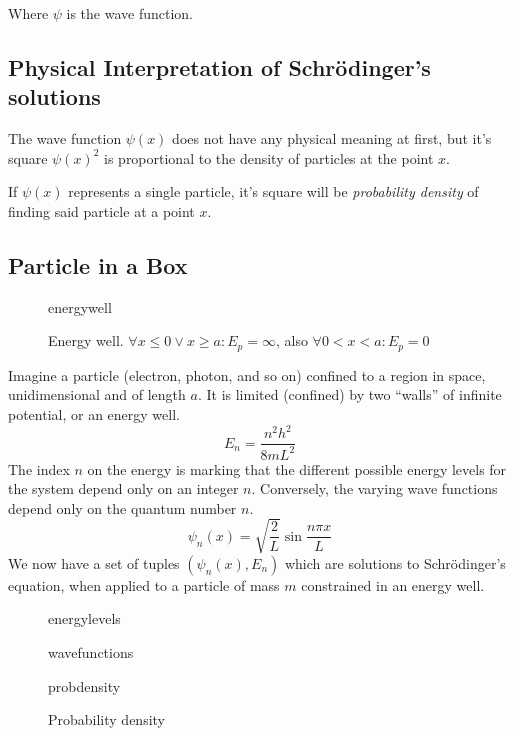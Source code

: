 \documentclass[10pt]{article}
\begin{document}
Where $\psi$ is the wave function.

\subsection{Physical Interpretation of Schrödinger's solutions}
The wave function $\psi(x)$ does not have any physical meaning at first, but
it's square $\psi{(x)}^2$ is proportional to the density of particles at the point
$x$.

If $\psi(x)$ represents a single particle, it's square will be \emph{probability density}
of finding said particle at a point $x$.

\subsection{Particle in a Box}
\begin{figure}
	{energywell}
	\caption{Energy well. $\forall x\le 0 \vee x\ge a : E_p=\infty$, also $\forall 0<x<a : E_p=0 $}\label{fig:energywell}
\end{figure}
Imagine a particle (electron, photon, and so on) confined to a region in space,
unidimensional and of length $a$. It is limited (confined) by two ``walls'' of
infinite potential, or an energy well.
\begin{equation*}
	E_n=\frac{n^2h^2}{8mL^2}
\end{equation*}
The index $n$ on the energy is marking that the different possible energy levels
for the system depend only on an integer $n$. Conversely, the varying wave
functions depend only on the quantum number $n$.
\begin{equation*}
	\psi_n(x) = \sqrt{\frac{2}{L}}\sin{\frac{n\pi x}{L}}
\end{equation*}
We now have a set of tuples $(\psi_n(x), E_n)$ which are solutions to
Schrödinger's equation, when applied to a particle of mass $m$ constrained in an
energy well.
\vspace{2.5cm}
\begin{figure}[H]
	\centering
	\begin{minipage}{.5\textwidth}
		\centering
		{energylevels}
		\label{fig:energylevels}
	\end{minipage}%
	\begin{minipage}{.5\textwidth}
		\centering
		{wavefunctions}
		\label{fig:wavefunctions}
	\end{minipage}
\end{figure}
\clearpage
\begin{figure}
	\centering
	{probdensity}
	\caption{Probability density}
\end{figure}
\end{document}
